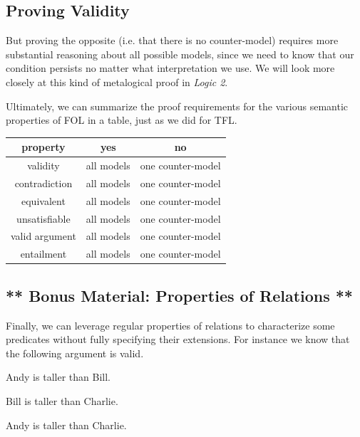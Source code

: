 \subsection{Proving Validity}

But proving the opposite (i.e. that there is no counter-model) requires more
substantial reasoning about all possible models, since we need to know that
our condition persists no matter what interpretation we use. We will look more
closely at this kind of metalogical proof in \emph{Logic 2}.


Ultimately, we can summarize the proof requirements for the various semantic
properties of FOL in a table, just as we did for TFL.

\begin{center}
  \begin{tabular}{c|c c}
    property & \textbf{yes} & \textbf{no} \\
    \hline
    validity       & all models & one counter-model \\
    contradiction  & all models & one counter-model \\
    equivalent     & all models & one counter-model \\
    unsatisfiable  & all models & one counter-model \\
    valid argument & all models & one counter-model \\
    entailment     & all models & one counter-model \\
  \end{tabular}
\end{center}

\subsection{** Bonus Material: Properties of Relations **}

Finally, we can leverage regular properties of relations to characterize some
predicates without fully specifying their extensions. For instance we know
that the following argument is valid.

\begin{argument}
\item[ ] Andy is taller than Bill.
\item[ ] Bill is taller than Charlie.
\item[\therefore] Andy is taller than Charlie. 
\end{argument}

